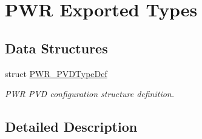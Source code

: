 \hypertarget{group___p_w_r___exported___types}{}\section{P\+WR Exported Types}
\label{group___p_w_r___exported___types}
\subsection*{Data Structures}
\begin{DoxyCompactItemize}
\item 
struct \hyperlink{struct_p_w_r___p_v_d_type_def}{P\+W\+R\+\_\+\+P\+V\+D\+Type\+Def}
\begin{DoxyCompactList}\small\item\em P\+WR P\+VD configuration structure definition. \end{DoxyCompactList}\end{DoxyCompactItemize}


\subsection{Detailed Description}
